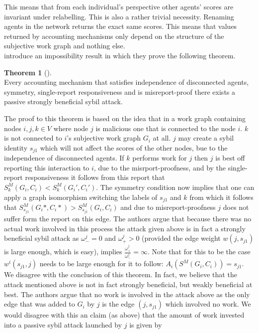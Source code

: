 \documentclass[11pt,a4paper]{article}
\theoremstyle{definition}
\theoremstyle{theorem}
\newtheorem{theorem}{Theorem}[section]
\theoremstyle{proposition}
\theoremstyle{corollary}
\theoremstyle{lemma}
\theoremstyle{example}
\theoremstyle{remark}
\begin{document}
\noindent{}This means that from each individual's perspective other agents' scores are invariant under relabelling. This is also a rather trivial necessity. Renaming agents in the network returns the exact same scores. This means that values returned by accounting mechanisms only depend on the structure of the subjective work graph and nothing else. \vspace{1em}\\

\noindent{}\cite{On the Sybil-Proofness of Accounting Mechanisms} introduce an impossibility result in which they prove the following theorem.

\begin{theorem}[]\ \\
Every accounting mechanism that satisfies independence of disconnected agents, symmetry, single-report responsiveness and is misreport-proof there exists a passive strongly beneficial sybil attack.
\end{theorem}

\noindent{}The proof to this theorem is based on the idea that in a work graph containing nodes $i,j,k\in{}V$ where node $j$ is malicious one that is connected to the node $i$. $k$ is not connected to $i$'s subjective work graph $G_i$ at all. $j$ may create a sybil identity $s_{j1}$ which will not affect the scores of the other nodes, bue to the independence of disconnected agents. If $k$ performs work for $j$ then $j$ is best off reporting this interaction to $i$, due to the misrport-proofness, and by the single-report responsiveness it follows from this report that $S^M_k(G_i,C_i) < S^M_k(G_i',C_i')$. The symmetry condition now implies that one can apply a graph isomorphism switching the labels of $s_{j1}$ and $k$ from which it follows that $S^M_{s_{j1}}(G_i*,C_i*) > S^M_{s_{j1}}(G_i,C_i)$ and due to misreport-proofness $j$ does not suffer form the report on this edge. The authors argue that because there was no actual work involved in this process the attack given above is in fact a strongly beneficial sybil attack as $\omega^j_{-}=0$ and $\omega^j_{+}>0$ (provided the edge weight $w(j,s_{j1})$ is large enough, which is easy), implies $\frac{\omega^j_{+}}{\omega^j_{-}}=\infty$. Note that for this to be the case $w^i(s_{j1},j)$ needs to be large enough for it to follow: $A_i(S^M(G_i,C_i))=s_{j1}$. \vspace{1em}\\

\noindent{}We disagree with the conclusion of this theorem. In fact, we believe that the attack mentioned above is not in fact strongly beneficial, but weakly beneficial at best. The authors argue that no work is involved in the attack above as the only edge that was added to $G_i$ by $j$ is the edge $(j,s_{j1})$ which involved no work. We would disagree with this an claim (as above) that the amount of work invested into a passive sybil attack launched by $j$ is given by 
\end{document}
